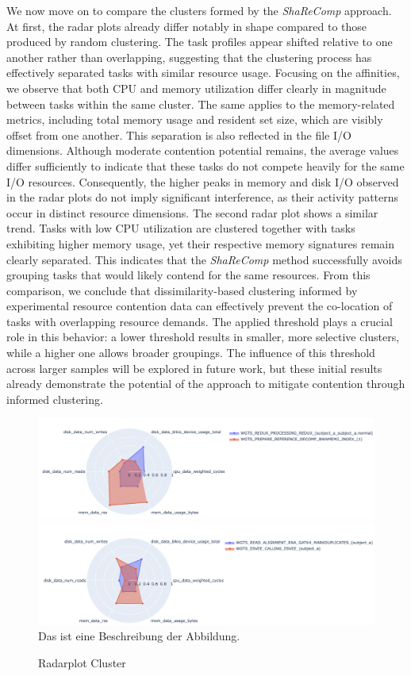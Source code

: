 We now move on to compare the clusters formed by the \textit{ShaReComp} approach. At first, the radar plots already differ notably in shape compared to those produced by random clustering. The task profiles appear shifted relative to one another rather than overlapping, suggesting that the clustering process has effectively separated tasks with similar resource usage. Focusing on the affinities, we observe that both CPU and memory utilization differ clearly in magnitude between tasks within the same cluster. The same applies to the memory-related metrics, including total memory usage and resident set size, which are visibly offset from one another.
This separation is also reflected in the file I/O dimensions. Although moderate contention potential remains, the average values differ sufficiently to indicate that these tasks do not compete heavily for the same I/O resources. Consequently, the higher peaks in memory and disk I/O observed in the radar plots do not imply significant interference, as their activity patterns occur in distinct resource dimensions.
The second radar plot shows a similar trend. Tasks with low CPU utilization are clustered together with tasks exhibiting higher memory usage, yet their respective memory signatures remain clearly separated. This indicates that the \textit{ShaReComp} method successfully avoids grouping tasks that would likely contend for the same resources.
From this comparison, we conclude that dissimilarity-based clustering informed by experimental resource contention data can effectively prevent the co-location of tasks with overlapping resource demands. The applied threshold plays a crucial role in this behavior: a lower threshold results in smaller, more selective clusters, while a higher one allows broader groupings. The influence of this threshold across larger samples will be explored in future work, but these initial results already demonstrate the potential of the approach to mitigate contention through informed clustering.

\begin{figure}[H]
    \caption{Radarplot Cluster}
    \includegraphics[scale=0.45]{fig/06/06-radarplot-cluster.png}
    \includegraphics[scale=0.45]{fig/06/06-radarplot-cluster-2.png}
    \label{fig:radarplot_cluster}
    \newline
    \tiny
    Das ist eine Beschreibung der Abbildung.
\end{figure}

